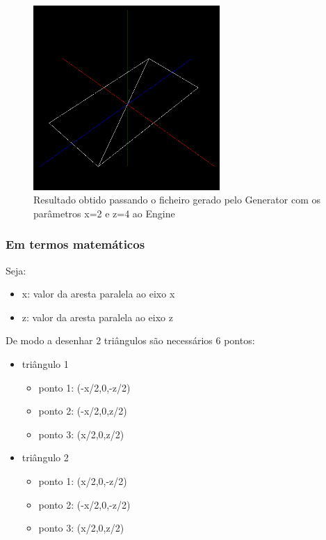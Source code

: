 \documentclass{article}
\begin{document}
\begin{figure}[ht!]
\centering
\includegraphics[height=7cm]{plane.png}
\caption{Resultado obtido passando o ficheiro gerado pelo Generator com os parâmetros x=2 e z=4 ao Engine}
\end{figure}

\subsubsection{Em termos matemáticos}
Seja:
\begin{itemize}
    \item x: valor da aresta paralela ao eixo x
    \item z: valor da aresta paralela ao eixo z
\end{itemize}
De modo a desenhar 2 triângulos são necessários 6 pontos:
\begin{itemize}
    \item triângulo 1
        \begin{itemize}
            \item ponto 1: (-x/2,0,-z/2)
            \item ponto 2: (-x/2,0,z/2)
            \item ponto 3: (x/2,0,z/2)
        \end{itemize}
    \item triângulo 2
        \begin{itemize}
            \item ponto 1: (x/2,0,-z/2)
            \item ponto 2: (-x/2,0,-z/2)
            \item ponto 3: (x/2,0,z/2)
        \end{itemize}
\end{itemize}
\end{document}

